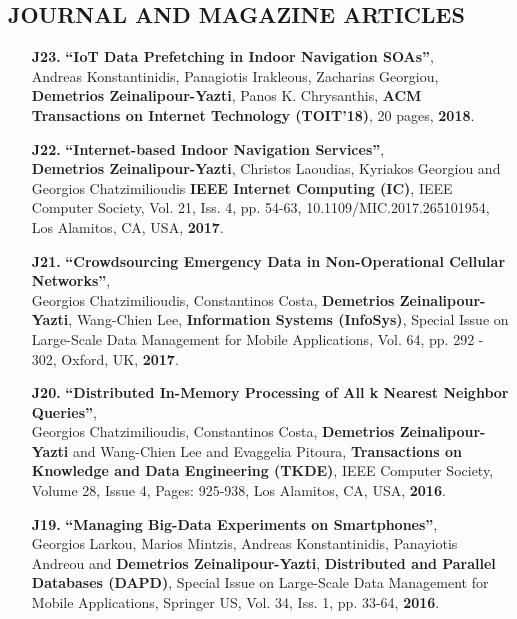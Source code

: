 \documentclass[10pt]{article}
\begin{document}
\subsection*{JOURNAL AND MAGAZINE ARTICLES}
\begin{enumerate}

\item[{\bf J23.}]
\label{J23} %
{\bf ``IoT Data Prefetching in Indoor Navigation SOAs''}, \\
Andreas Konstantinidis, Panagiotis Irakleous, Zacharias Georgiou,
{\bf Demetrios Zeinalipour-Yazti}, Panos K. Chrysanthis,
{\bf ACM Transactions on Internet Technology (TOIT'18)}, 20 pages, {\bf 2018}.

\item[{\bf J22.}]
\label{J22} %
{\bf ``Internet-based Indoor Navigation Services''}, \\
{\bf Demetrios Zeinalipour-Yazti}, Christos Laoudias, Kyriakos Georgiou and Georgios Chatzimilioudis
{\bf IEEE Internet Computing (IC)}, IEEE Computer Society, Vol. 21, Iss. 4, pp. 54-63, 10.1109/MIC.2017.265101954, Los Alamitos, CA, USA, {\bf 2017}.

\item[{\bf J21.}]
\label{J21} %
{\bf ``Crowdsourcing Emergency Data in Non-Operational Cellular Networks''}, \\
Georgios Chatzimilioudis, Constantinos Costa,  {\bf Demetrios Zeinalipour-Yazti}, Wang-Chien Lee,
{\bf Information Systems (InfoSys)}, Special Issue on Large-Scale Data Management for Mobile Applications,
Vol. 64, pp. 292 - 302, Oxford, UK, {\bf 2017}.

\item[{\bf J20.}]
\label{J20} %
{\bf ``Distributed In-Memory Processing of All k Nearest Neighbor Queries''}, \\
Georgios Chatzimilioudis, Constantinos Costa, {\bf Demetrios Zeinalipour-Yazti} and
Wang-Chien Lee and Evaggelia Pitoura,
{\bf Transactions on Knowledge and Data Engineering (TKDE)},
IEEE Computer Society, Volume 28, Issue 4, Pages: 925-938, Los Alamitos, CA, USA, {\bf 2016}.

\item[{\bf J19.}]
\label{J19} %
{\bf ``Managing Big-Data Experiments on Smartphones''}, \\
Georgios Larkou, Marios Mintzis, Andreas Konstantinidis, Panayiotis Andreou and {\bf Demetrios Zeinalipour-Yazti},
{\bf Distributed and Parallel Databases (DAPD)}, Special Issue on Large-Scale Data Management for Mobile Applications, Springer US, Vol. 34, Iss. 1, pp. 33-64, {\bf 2016}.


\end{enumerate}
\end{document}
